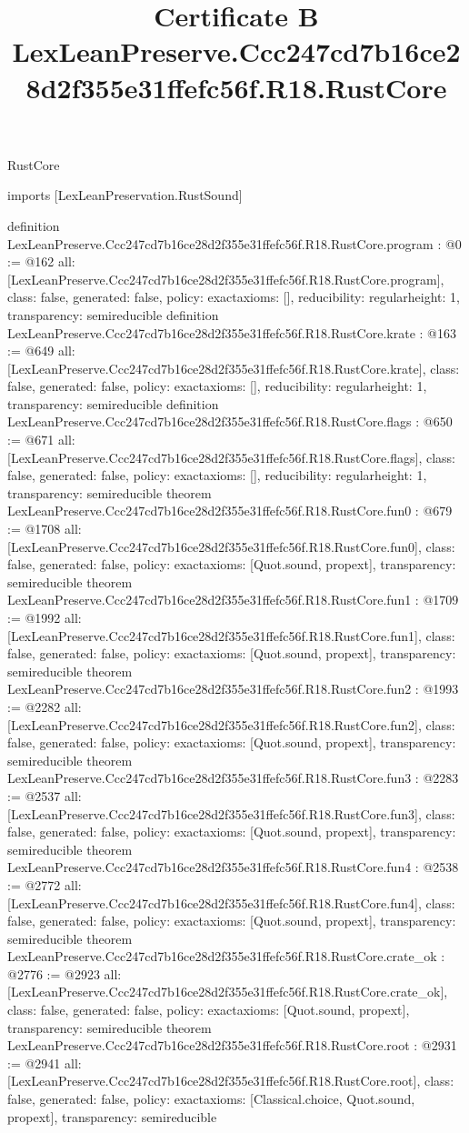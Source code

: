 \begin{lexlean}{RustCore}
\title{Certificate B LexLeanPreserve.Ccc247cd7b16ce28d2f355e31ffefc56f.R18.RustCore}
\begin{coremodule}
imports [LexLeanPreservation.RustSound]

definition LexLeanPreserve.Ccc247cd7b16ce28d2f355e31ffefc56f.R18.RustCore.program : @0 := @162 {
  all: [LexLeanPreserve.Ccc247cd7b16ce28d2f355e31ffefc56f.R18.RustCore.program],
  class: false,
  generated: false,
  policy: exact{axioms: []},
  reducibility: regular{height: 1},
  transparency: semireducible
}
definition LexLeanPreserve.Ccc247cd7b16ce28d2f355e31ffefc56f.R18.RustCore.krate : @163 := @649 {
  all: [LexLeanPreserve.Ccc247cd7b16ce28d2f355e31ffefc56f.R18.RustCore.krate],
  class: false,
  generated: false,
  policy: exact{axioms: []},
  reducibility: regular{height: 1},
  transparency: semireducible
}
definition LexLeanPreserve.Ccc247cd7b16ce28d2f355e31ffefc56f.R18.RustCore.flags : @650 := @671 {
  all: [LexLeanPreserve.Ccc247cd7b16ce28d2f355e31ffefc56f.R18.RustCore.flags],
  class: false,
  generated: false,
  policy: exact{axioms: []},
  reducibility: regular{height: 1},
  transparency: semireducible
}
theorem LexLeanPreserve.Ccc247cd7b16ce28d2f355e31ffefc56f.R18.RustCore.fun0 : @679 := @1708 {
  all: [LexLeanPreserve.Ccc247cd7b16ce28d2f355e31ffefc56f.R18.RustCore.fun0],
  class: false,
  generated: false,
  policy: exact{axioms: [Quot.sound, propext]},
  transparency: semireducible
}
theorem LexLeanPreserve.Ccc247cd7b16ce28d2f355e31ffefc56f.R18.RustCore.fun1 : @1709 := @1992 {
  all: [LexLeanPreserve.Ccc247cd7b16ce28d2f355e31ffefc56f.R18.RustCore.fun1],
  class: false,
  generated: false,
  policy: exact{axioms: [Quot.sound, propext]},
  transparency: semireducible
}
theorem LexLeanPreserve.Ccc247cd7b16ce28d2f355e31ffefc56f.R18.RustCore.fun2 : @1993 := @2282 {
  all: [LexLeanPreserve.Ccc247cd7b16ce28d2f355e31ffefc56f.R18.RustCore.fun2],
  class: false,
  generated: false,
  policy: exact{axioms: [Quot.sound, propext]},
  transparency: semireducible
}
theorem LexLeanPreserve.Ccc247cd7b16ce28d2f355e31ffefc56f.R18.RustCore.fun3 : @2283 := @2537 {
  all: [LexLeanPreserve.Ccc247cd7b16ce28d2f355e31ffefc56f.R18.RustCore.fun3],
  class: false,
  generated: false,
  policy: exact{axioms: [Quot.sound, propext]},
  transparency: semireducible
}
theorem LexLeanPreserve.Ccc247cd7b16ce28d2f355e31ffefc56f.R18.RustCore.fun4 : @2538 := @2772 {
  all: [LexLeanPreserve.Ccc247cd7b16ce28d2f355e31ffefc56f.R18.RustCore.fun4],
  class: false,
  generated: false,
  policy: exact{axioms: [Quot.sound, propext]},
  transparency: semireducible
}
theorem LexLeanPreserve.Ccc247cd7b16ce28d2f355e31ffefc56f.R18.RustCore.crate_ok : @2776 := @2923 {
  all: [LexLeanPreserve.Ccc247cd7b16ce28d2f355e31ffefc56f.R18.RustCore.crate_ok],
  class: false,
  generated: false,
  policy: exact{axioms: [Quot.sound, propext]},
  transparency: semireducible
}
theorem LexLeanPreserve.Ccc247cd7b16ce28d2f355e31ffefc56f.R18.RustCore.root : @2931 := @2941 {
  all: [LexLeanPreserve.Ccc247cd7b16ce28d2f355e31ffefc56f.R18.RustCore.root],
  class: false,
  generated: false,
  policy: exact{axioms: [Classical.choice, Quot.sound, propext]},
  transparency: semireducible
}


\end{coremodule}
\end{lexlean}
